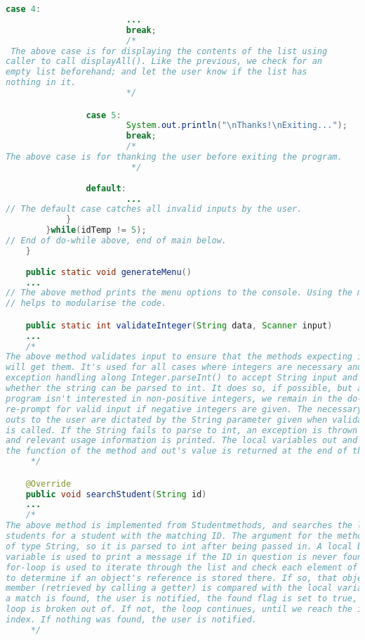 \documentclass{article}
\begin{document}
\begin{large}
\begin{lstlisting}[language=Java]
				case 4:
						...
						break;
						/*
 The above case is for displaying the contents of the list using
caller to call displayAll(). Like the previous, we check for an 
empty list beforehand; and let the user know if the list has 
nothing in it. 
						*/

				case 5:
						System.out.println("\nThanks!\nExiting...");
						break;
						/*
The above case is for thanking the user before exiting the program.
						 */
				
				default:
						...
// The default case catches all invalid inputs by the user.
			}
		}while(idTemp != 5);
// End of do-while above, end of main below.	
	}	
	
	public static void generateMenu()
	...
// The above method prints the menu options to the console. Using the method
// helps to modularise the code.

	public static int validateInteger(String data, Scanner input)
	...
	/*
The above method validates input to ensure that the methods expecting integers
will get them. It's used for all cases where integers are necessary and uses
exception handling along Integer.parseInt() to accept String input and determine
whether the string can be parsed to int. It does so, if possible, but as the 
program isn't interested in non-positive integers, we remain in the do-while to
re-prompt for valid input if negative integers are given. The necessary print 
outs to the user are dictated by the String parameter given when validateInteger()
is called. If the String fails to parse to int, an exception is thrown and caught,
and relevant usage information is printed. The local variables out and temp facilitate
the function of the method and out's value is returned at the end of the method.
	 */

	@Override
	public void searchStudent(String id)
	...
	/*
The above method is implemented from Studentmethods, and searches the list of 
students for a student with the matching ID. The argument for the method is 
of type String, so it is parsed to int after being passed in. A local boolean
variable is used to print a message if the ID in question is never found. A 
for-loop is used to iterate through the list and check each element of the list
to determine if an object's reference is stored there. If so, that object's ID
member (retrieved by calling a getter) is compared with the local variable. If 
a match is found, the user is notified, the found flag is set to true, and the
loop is broken out of. If not, the loop continues, until we reach the insertion
index. If nothing was found, the user is notified. 
	 */


\end{lstlisting}
\end{large}
\end{document}
